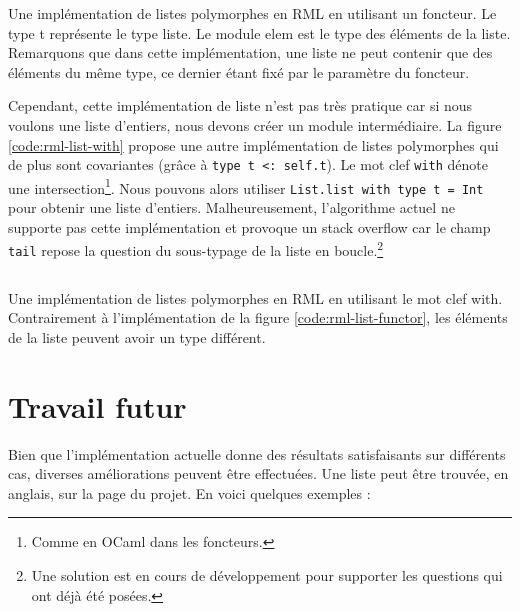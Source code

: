 \begin{listing}
  \inputminted{OCaml}{codes/list_functor.rml}
  \caption{Une implémentation de listes polymorphes en RML en utilisant un
    foncteur. Le type t représente le type liste. Le module elem
    est le type des éléments de la liste. Remarquons que dans cette
    implémentation, une liste ne peut contenir que des éléments du même type, ce
    dernier étant fixé par le paramètre du foncteur.}
  \label{code:rml-list-functor}
\end{listing}

Cependant, cette implémentation de liste n'est pas très pratique car si nous
voulons une liste d'entiers, nous devons créer un module intermédiaire. La figure
\ref{code:rml-list-with} propose une autre implémentation de listes polymorphes
qui de plus sont covariantes (grâce à \verb|type t <: self.t|). Le mot clef
\verb|with| dénote une intersection\footnote{Comme en OCaml dans
  les foncteurs.}. Nous pouvons alors utiliser \verb|List.list with type t = Int|
pour obtenir une liste d'entiers. Malheureusement, l'algorithme actuel ne
supporte pas cette implémentation et provoque un stack overflow car le champ
\verb|tail| repose la question du sous-typage de la liste en
boucle.\footnote{Une solution est en cours de développement pour supporter les
  questions qui ont déjà été posées.}

\begin{listing}
  \inputminted{OCaml}{codes/list.rml}
  \caption{Une implémentation de listes polymorphes en RML en utilisant le mot
    clef with. Contrairement à l'implémentation de la figure
    \ref{code:rml-list-functor}, les éléments de la liste peuvent avoir un type
  différent.}
  \label{code:rml-list-with}
\end{listing}

\section{Travail futur}

Bien que l'implémentation actuelle donne des résultats satisfaisants sur
différents cas, diverses améliorations peuvent être effectuées. Une liste
peut être trouvée, en anglais, sur la page du
projet\cite{rml-github-issues}. En voici quelques exemples :

